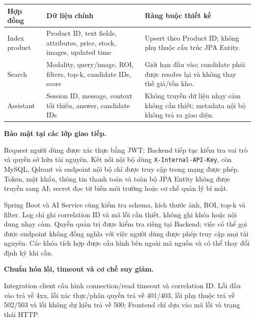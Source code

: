 \begin{breakabletable}
    \centering
    \caption{Các hợp đồng chính giữa Spring Boot và AI Service}
    \label{tab:spring-ai-contracts}
    \begin{tabularx}{\textwidth}{|p{}|p{}|X|}
        \hline
        \textbf{Hợp đồng} & \textbf{Dữ liệu chính} & \textbf{Ràng buộc thiết kế} \\
        \hline
        Index product & Product ID, text fields, attributes, price, stock, images, updated time & Upsert theo Product ID; không phụ thuộc cấu trúc JPA Entity. \\
        \hline
        Search & Modality, query/image, ROI, filters, top-k, candidate IDs, score & Giới hạn đầu vào; candidate phải được resolve lại và không thay thế giá/tồn kho. \\
        \hline
        Assistant & Session ID, message, context tối thiểu, answer, candidate IDs & Không truyền dữ liệu nhạy cảm không cần thiết; metadata nội bộ không trả ra giao diện. \\
        \hline
    \end{tabularx}
\end{breakabletable}

\textbf{Bảo mật tại các lớp giao tiếp.}

Request người dùng được xác thực bằng JWT; Backend tiếp tục kiểm tra vai trò và
quyền sở hữu tài nguyên. Kết nối nội bộ dùng \texttt{X-Internal-API-Key}, còn
MySQL, Qdrant và endpoint nội bộ chỉ được truy cập trong mạng được phép. Token,
mật khẩu, thông tin thanh toán và toàn bộ JPA Entity không được truyền sang AI;
secret đọc từ biến môi trường hoặc cơ chế quản lý bí mật.

Spring Boot và AI Service cùng kiểm tra schema, kích thước ảnh, ROI, top-k và
filter. Log chỉ ghi correlation ID và mã lỗi cần thiết, không ghi khóa hoặc nội
dung nhạy cảm. Quyền quản trị được kiểm tra riêng tại Backend; việc có thể gọi
được endpoint không đồng nghĩa với việc người dùng được phép truy cập mọi tài
nguyên. Các khóa tích hợp được cấu hình bên ngoài mã nguồn và có thể thay đổi
định kỳ khi cần.

\textbf{Chuẩn hóa lỗi, timeout và cơ chế suy giảm.}

Integration client cấu hình connection/read timeout và correlation ID. Lỗi đầu vào
trả về 4xx, lỗi xác thực/phân quyền trả về 401/403, lỗi phụ thuộc trả về 502/503
và lỗi không dự kiến trả về 500; Frontend chỉ dựa vào mã lỗi và trạng thái HTTP.

